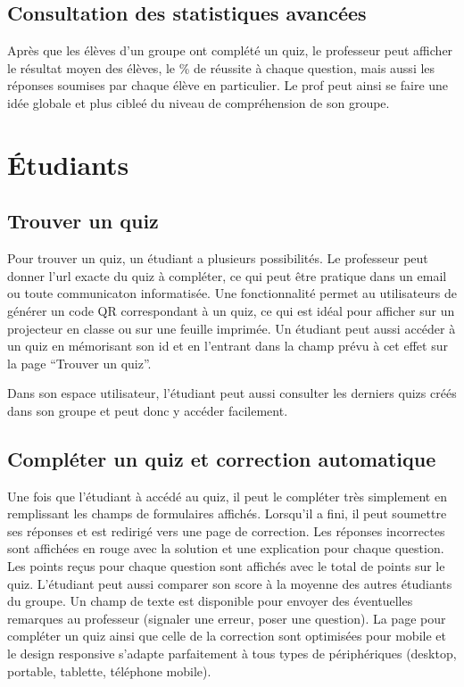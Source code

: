 \documentclass[letterpaper,10pt,french]{sphinxmanual}
\begin{document}
\subsection{Consultation des statistiques avancées}
\label{functionalities:consultation-des-statistiques-avancees}
Après que les élèves d'un groupe ont complété un quiz, le professeur peut afficher le résultat moyen des élèves, le \% de réussite à chaque question, mais aussi les réponses soumises par chaque élève en particulier. Le prof peut ainsi se faire une idée globale et plus cibleé du niveau de compréhension de son groupe.


\section{Étudiants}
\label{functionalities:etudiants}

\subsection{Trouver un quiz}
\label{functionalities:trouver-un-quiz}
Pour trouver un quiz, un étudiant a plusieurs possibilités. Le professeur peut donner l'url exacte du quiz à compléter, ce qui peut être pratique dans un email ou toute communicaton informatisée. Une fonctionnalité permet au utilisateurs de générer un code QR correspondant à un quiz, ce qui est idéal pour afficher sur un projecteur en classe ou sur une feuille imprimée. Un étudiant peut aussi accéder à un quiz en mémorisant son id et en l'entrant dans la champ prévu à cet effet sur la page ``Trouver un quiz''.

Dans son espace utilisateur, l'étudiant peut aussi consulter les derniers quizs créés dans son groupe et peut donc y accéder facilement.


\subsection{Compléter un quiz et correction automatique}
\label{functionalities:completer-un-quiz-et-correction-automatique}
Une fois que l'étudiant à accédé au quiz, il peut le compléter très simplement en remplissant les champs de formulaires affichés. Lorsqu'il a fini, il peut soumettre ses réponses et est redirigé vers une page de correction. Les réponses incorrectes sont affichées en rouge avec la solution et une explication pour chaque question. Les points reçus pour chaque question sont affichés avec le total de points sur le quiz. L'étudiant peut aussi comparer son score à la moyenne des autres étudiants du groupe. Un champ de texte est disponible pour envoyer des éventuelles remarques au professeur (signaler une erreur, poser une question). La page pour compléter un quiz ainsi que celle de la correction sont optimisées pour mobile et le design responsive s'adapte parfaitement à tous types de périphériques (desktop, portable, tablette, téléphone mobile).
\end{document}
